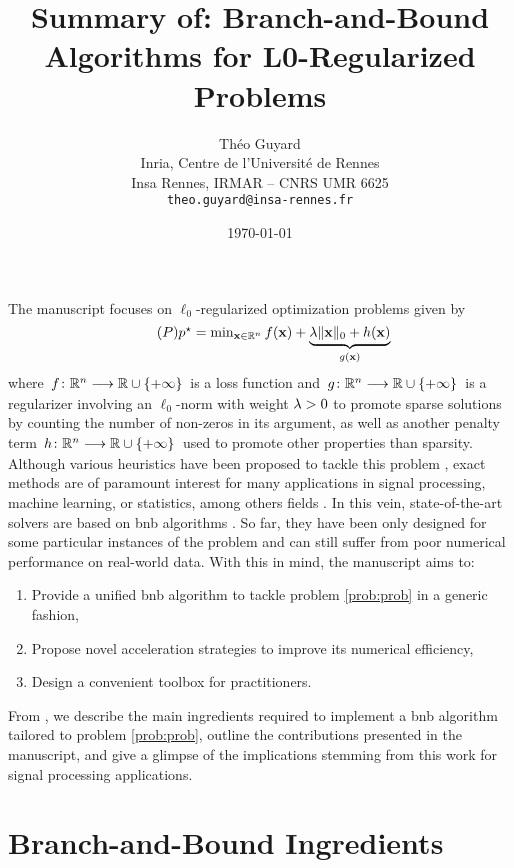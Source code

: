 \documentclass[11pt]{article}
\title{Summary of: Branch-and-Bound Algorithms for L0-Regularized Problems}
\author{Théo Guyard \\ Inria, Centre de l'Université de Rennes \\ Insa Rennes, IRMAR -- CNRS UMR 6625 \\ \texttt{theo.guyard@insa-rennes.fr}}
\date{\today}
\begin{document}
 

\maketitle

The manuscript focuses on $\ell_0$-regularized optimization problems given by
\begin{equation}
    \label{prob:prob}
    \tag{$\ppb$}
    \textstyle
    \opt{\pobj} = \min_{\pv \in \kR^{\pdim}} \lfunc(\pv) + \underbrace{\reg\norm{\pv}{0} + \pfunc(\pv)}_{\rfunc(\pv)}
\end{equation}
where $\kfuncdef{\lfunc}{\kR^{\pdim}}{\kR \cup \{+\infty\}}$ is a loss function and $\kfuncdef{\rfunc}{\kR^{\pdim}}{\kR \cup \{+\infty\}}$ is a regularizer involving an $\ell_0$-norm with weight $\lambda > 0$ to promote sparse solutions by counting the number of non-zeros in its argument, as well as another penalty term $\kfuncdef{\pfunc}{\kR^{\pdim}}{\kR \cup \{+\infty\}}$ used to promote other properties than sparsity.
Although various heuristics have been proposed to tackle this problem \cite{tropp2010computational}, exact methods are of paramount interest for many applications in signal processing, machine learning, or statistics, among others fields \citep{tillmann2021cardinality,bertsimas2016best}.
In this vein, state-of-the-art solvers are based on \gls{bnb} algorithms \citep{ben2022global,hazimeh2022sparse}.
So far, they have been only designed for some particular instances of the problem and can still suffer from poor numerical performance on real-world data.
With this in mind, the manuscript aims to:
\begin{enumerate}[nosep, label=\arabic*.]
    \item Provide a unified \gls{bnb} algorithm to tackle problem \eqref{prob:prob} in a generic fashion,
    \item Propose novel acceleration strategies to improve its numerical efficiency,
    \item Design a convenient toolbox for practitioners.
\end{enumerate} 
From , we describe the main ingredients required to implement a \gls{bnb} algorithm tailored to problem \eqref{prob:prob}, outline the contributions presented in the manuscript, and give a glimpse of the implications stemming from this work for signal processing applications.


\section{Branch-and-Bound Ingredients}
\label{sec:bnb}
\end{document}
